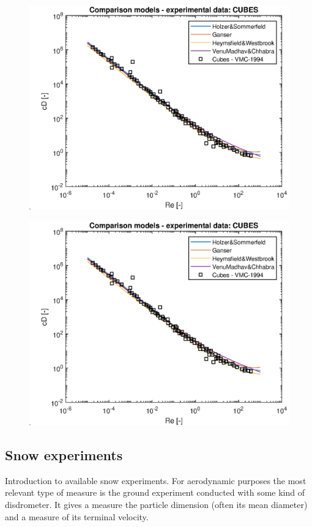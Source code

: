 \documentclass[a4paper,12pt,twoside,titlepage,openright]{book}
\begin{document}
		\begin{figure}[]
			\includegraphics{cube_cD.eps}
			\caption{}
			\label{fig: cube}
		\end{figure}
		\begin{figure}[]
			\includegraphics{cube_cD.eps}
			\caption{}
			\label{fig: cylinder}
		\end{figure}
	
	\subsection{Snow experiments}
		Introduction to available snow experiments. For aerodynamic purposes the most relevant type of measure is the ground experiment conducted with some kind of disdrometer. It gives a measure the particle dimension (often its mean diameter) and a measure of its terminal velocity.
		
\end{document}
